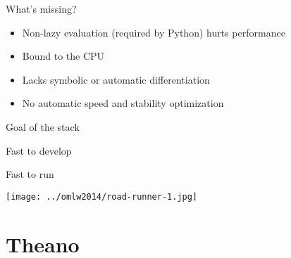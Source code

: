 \documentclass[utf8x,xcolor=pdftex,dvipsnames,table]{beamer}
\begin{document}
\begin{frame}{What's missing?}
  \begin{itemize}
    \item Non-lazy evaluation (required by Python) hurts performance
    \item Bound to the CPU
    \item Lacks symbolic or automatic differentiation
    \item No automatic speed and stability optimization
  \end{itemize}

\end{frame}

\begin{frame}{Goal of the stack}
\begin{center}
\begin{bf}Fast to develop\end{bf}\newline \bigskip
\begin{bf}Fast to run\end{bf}\newline \bigskip
\hspace{-2.5cm}
\texttt{[image: ../omlw2014/road-runner-1.jpg]}
\end{center}
\end{frame}


\section{Theano}
\begin{frame}
  \tableofcontents[currentsection]
\end{frame}
\end{document}
